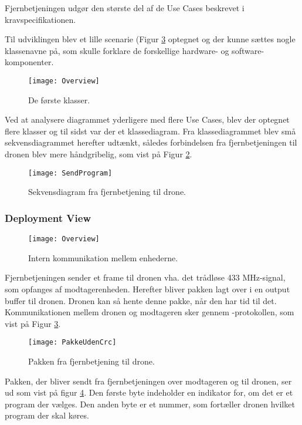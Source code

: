 \documentclass[Main]{subfiles}
\begin{document}
Fjernbetjeningen udgør den største del af de Use Cases beskrevet i kravspecifikationen\cite{Kravspec}.

Til udviklingen blev et lille scenarie (Figur \ref{Fig:Overview} optegnet og der kunne sættes nogle klassenavne på, som skulle forklare de forskellige hardware- og software-komponenter.

\begin{figure}[H]
\centering
\texttt{[image: Overview]}
\caption{De første klasser.}
\label{Fig:Overview}
\end{figure}


Ved at analysere diagrammet yderligere med flere Use Cases, blev der optegnet flere klasser og til sidst var der et klassediagram. 
Fra klassediagrammet blev små sekvensdiagrammet herefter udtænkt, således forbindelsen fra fjernbetjeningen til dronen blev mere håndgribelig, som vist på Figur \ref{Fig:sendProgram}.


\begin{figure}[H]
\centering
\texttt{[image: SendProgram]}
\caption{Sekvensdiagram fra fjernbetjening til drone.}
\label{Fig:sendProgram}
\end{figure}

\subsubsection*{Deployment View}

\begin{figure}[H]
\centering
\texttt{[image: Overview]}
\caption{Intern kommunikation mellem enhederne.}
\label{Fig:Overview}
\end{figure}

Fjernbetjeningen sender et frame til dronen vha. det trådløse 433 MHz-signal, som opfanges af modtagerenheden.
Herefter bliver pakken lagt over i en output buffer til dronen. Dronen kan så hente denne pakke, når den har tid til det. 
Kommunikationen mellem dronen og modtageren sker gennem \itoc-protokollen, som vist på Figur \ref{Fig:Overview}.


\begin{figure}[H]
\centering
\texttt{[image: PakkeUdenCrc]}
\caption{Pakken fra fjernbetjening til drone.}
\label{Fig:PakkeUdenCrc}
\end{figure}

Pakken, der bliver sendt fra fjernbetjeningen over modtageren og til dronen, ser ud som vist på figur \ref{Fig:PakkeUdenCrc}.
Den første byte indeholder en indikator for, om det er et program der vælges.
Den anden byte er et nummer, som fortæller dronen hvilket program der skal køres.
\end{document}
